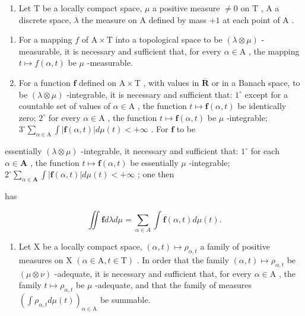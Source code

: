 \begin{enumerate}
\def\labelenumi{\arabic{enumi})}
\setcounter{enumi}{7}
\tightlist
\item
  Let \(\mathrm{T}\) be a locally compact space, \(\mu\) a positive measure \(\neq 0\) on \(\mathrm{T}\) , A a discrete space, \(\lambda\) the measure on \(\mathrm{A}\) defined by mass \(+1\) at each point of \(\mathrm{A}\) .
\end{enumerate}

\begin{enumerate}
\def\labelenumi{\alph{enumi})}
\item
  For a mapping \(f\) of \(\mathrm{A} \times \mathrm{T}\) into a topological space to be \((\lambda \otimes \mu)\) -measurable, it is necessary and sufficient that, for every \(\alpha \in \mathrm{A}\) , the mapping \(t \mapsto f(\alpha, t)\) be \(\mu\) -measurable.
\item
  For a function \(\mathbf{f}\) defined on \(\mathrm{A} \times \mathrm{T}\) , with values in \(\overline{\mathbf{R}}\) or in a Banach space, to be \((\lambda \otimes \mu)\) -integrable, it is necessary and sufficient that: \(1^{\circ}\) except for a countable set of values of \(\alpha \in \mathrm{A}\) , the function \(t \mapsto \mathbf{f}(\alpha, t)\) be identically zero; \(2^{\circ}\) for every \(\alpha \in \mathrm{A}\) , the function \(t \mapsto \mathbf{f}(\alpha, t)\) be \(\mu\) -integrable; \(3^{\circ} \sum_{\alpha \in \mathrm{A}} \int |\mathbf{f}(\alpha, t)| d\mu(t) < +\infty\) . For \(\mathbf{f}\) to be
\end{enumerate}

essentially \((\lambda \otimes \mu)\) -integrable, it necessary and sufficient that: \(1^{\circ}\) for each \(\alpha \in \mathbf{A}\) , the function \(t \mapsto \mathbf{f}(\alpha, t)\) be essentially \(\mu\) -integrable; \(2^{\circ} \sum_{\alpha \in \mathbf{A}} \int |\mathbf{f}(\alpha, t)| d\mu(t) < +\infty\) ; one then

has

\[
\iint \mathbf {f} d \lambda d \mu = \sum_ {\alpha \in A} \int \mathbf {f} (\alpha , t) d \mu (t).
\]

\begin{enumerate}
\def\labelenumi{\alph{enumi})}
\setcounter{enumi}{2}
\tightlist
\item
  Let X be a locally compact space, \((\alpha,t)\mapsto\rho_{\alpha,t}\) a family of positive measures on X \((\alpha\in\mathrm{A},t\in\mathrm{T})\) . In order that the family \((\alpha,t)\mapsto\rho_{\alpha,t}\) be \((\mu\otimes\nu)\) -adequate, it is necessary and sufficient that, for every \(\alpha\in\mathrm{A}\) , the family \(t\mapsto\rho_{\alpha,t}\) be \(\mu\) -adequate, and that the family of measures \(\left(\int\rho_{\alpha,t}d\mu(t)\right)_{\alpha\in\mathrm{A}}\) be summable.
\end{enumerate}


